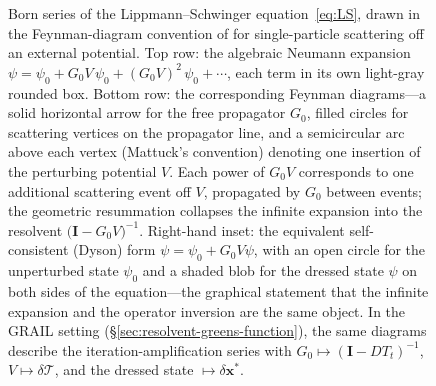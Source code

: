 \documentclass[11pt]{article}
\newcommand{\Tcyc}{\mathcal{T}}
\newcommand{\dT}{\delta\Tcyc}
\begin{document}
\begin{figure}[ht]
{%
}
\caption{Born series of the Lippmann--Schwinger
equation~\eqref{eq:LS}, drawn in the Feynman-diagram convention of
\citet[Ch.~3]{Mattuck1992} for single-particle scattering off an
external potential.  Top row: the algebraic Neumann expansion
$\psi = \psi_0 + G_0 V\,\psi_0 + (G_0 V)^2\,\psi_0 + \cdots$, each term
in its own light-gray rounded box.  Bottom row: the corresponding
Feynman diagrams---a solid horizontal arrow for the free propagator
$G_0$, filled circles for scattering vertices on the propagator line,
and a semicircular arc above each vertex (Mattuck's convention)
denoting one insertion of the perturbing potential $V$.  Each power
of $G_0 V$ corresponds to one additional scattering event off $V$,
propagated by $G_0$ between events; the geometric resummation
collapses the infinite expansion into the resolvent
$\bigl(\mathbf{I} - G_0 V\bigr)^{-1}$.  Right-hand inset: the
equivalent self-consistent (Dyson) form $\psi = \psi_0 + G_0 V \psi$,
with an open circle for the unperturbed state $\psi_0$ and a shaded
blob for the dressed state $\psi$ on both sides of the
equation---the graphical statement that the infinite expansion and
the operator inversion are the same object.  In the GRAIL setting
(\S\ref{sec:resolvent-greens-function}), the same diagrams describe
the iteration-amplification series with
$G_0 \mapsto (\mathbf{I} - DT_t)^{-1}$, $V \mapsto \dT$, and the
dressed state $\mapsto \delta\mathbf{x}^{*}$.}
\label{fig:born-series}
\end{figure}
\end{document}
